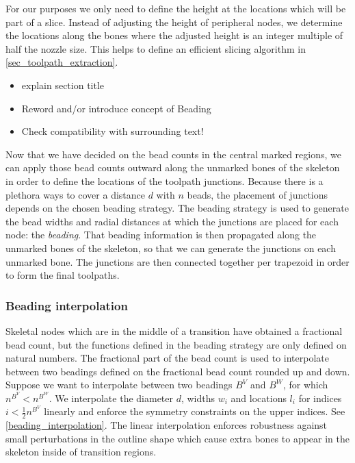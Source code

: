 For our purposes we only need to define the height at the locations which will be part of a slice.
Instead of adjusting the height of peripheral nodes, we determine the locations along the bones where the adjusted height is an integer multiple of half the nozzle size.
This helps to define an efficient slicing algorithm in \cref{sec_toolpath_extraction}.

\begin{itemize}
\item explain section title
\item Reword and/or introduce concept of Beading 
\item Check compatibility with surrounding text!
\end{itemize}


Now that we have decided on the bead counts in the central marked regions, we can apply those bead counts outward along the unmarked bones of the skeleton in order to define the locations of the toolpath junctions.
Because there is a plethora ways to cover a distance $d$ with $n$ beads, the placement of junctions depends on the chosen beading strategy.
The beading strategy is used to generate the bead widths and radial distances at which the junctions are placed for each node: the \emph{beading}.
That beading information is then propagated along the unmarked bones of the skeleton, so that we can generate the junctions on each unmarked bone.
The junctions are then connected together per trapezoid in order to form the final toolpaths.



\subsubsection{Beading interpolation}\label{section_beading_interpolation}
Skeletal nodes which are in the middle of a transition have obtained a fractional bead count, but the functions defined in the beading strategy are only defined on natural numbers.
The fractional part of the bead count is used to interpolate between two beadings defined on the fractional bead count rounded up and down.
Suppose we want to interpolate between two beadings $B^V$ and $B^W$, for which $n^{B^V} < n^{B^W}$.
We interpolate the diameter $d$, widths $w_i$ and locations $l_i$ for indices $i < \frac12 n^{B^V}$ linearly and enforce the symmetry constraints on the upper indices.
See \cref{beading_interpolation}.
The linear interpolation enforces robustness against small perturbations in the outline shape which cause extra bones to appear in the skeleton inside of transition regions.

